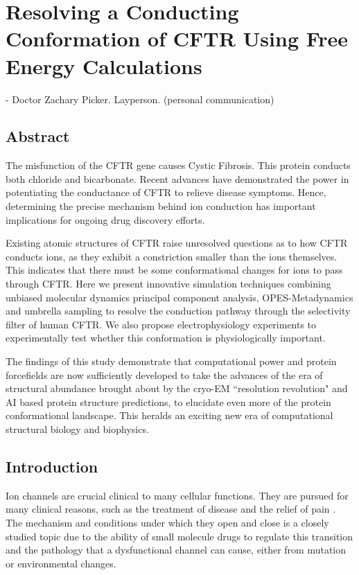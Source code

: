 \chapter{Resolving a Conducting Conformation of CFTR Using Free Energy Calculations}
\label{chap:opening}
 {- Doctor Zachary Picker. Layperson. (personal communication)}
\setcounter{figure}{0}
\renewcommand{\thefigure}{\arabic{chapter}.\arabic{figure}}


\section*{\centering Abstract} 
The misfunction of the CFTR gene causes Cystic Fibrosis. This protein conducts both chloride and bicarbonate. Recent advances have demonstrated the power in potentiating the conductance of CFTR to relieve disease symptoms. Hence, determining the precise mechanism behind ion conduction has important implications for ongoing drug discovery efforts.

Existing atomic structures of CFTR raise unresolved questions as to how CFTR conducts ions, as they exhibit a constriction smaller than the ions themselves. This indicates that there must be some conformational changes for ions to pass through CFTR. Here we present innovative simulation techniques combining unbiased molecular dynamics principal component analysis, OPES-Metadynamics and umbrella sampling to resolve the conduction pathway through the selectivity filter of human CFTR. We also propose electrophysiology experiments to experimentally test whether this conformation is physiologically important.  

The findings of this study demonstrate that computational power and protein forcefields are now sufficiently developed to take the advances of the era of structural abundance brought about by the cryo-EM ``resolution revolution" and AI based protein structure predictions, to elucidate even more of the protein conformational landscape. This heralds an exciting new era of computational structural biology and biophysics.


\section{Introduction}

Ion channels are crucial clinical to many cellular functions. They are pursued for many clinical reasons, such as the treatment of disease and the relief of pain \cite{}. The mechanism and conditions under which they open and close is a closely studied topic due to the ability of small molecule drugs to regulate this transition and the pathology that a dysfunctional channel can cause, either from mutation or environmental changes.

